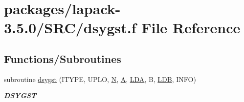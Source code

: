 \hypertarget{dsygst_8f}{}\section{packages/lapack-\/3.5.0/\+S\+R\+C/dsygst.f File Reference}
\label{dsygst_8f}
\subsection*{Functions/\+Subroutines}
\begin{DoxyCompactItemize}
\item 
subroutine \hyperlink{group__doubleSYcomputational_ga2de4dd06c6513d1a9b7776e32a1295c7}{dsygst} (I\+T\+Y\+P\+E, U\+P\+L\+O, \hyperlink{polmisc_8c_a0240ac851181b84ac374872dc5434ee4}{N}, \hyperlink{classA}{A}, \hyperlink{example__user_8c_ae946da542ce0db94dced19b2ecefd1aa}{L\+D\+A}, B, \hyperlink{example__user_8c_a50e90a7104df172b5a89a06c47fcca04}{L\+D\+B}, I\+N\+F\+O)
\begin{DoxyCompactList}\small\item\em {\bfseries D\+S\+Y\+G\+S\+T} \end{DoxyCompactList}\end{DoxyCompactItemize}
